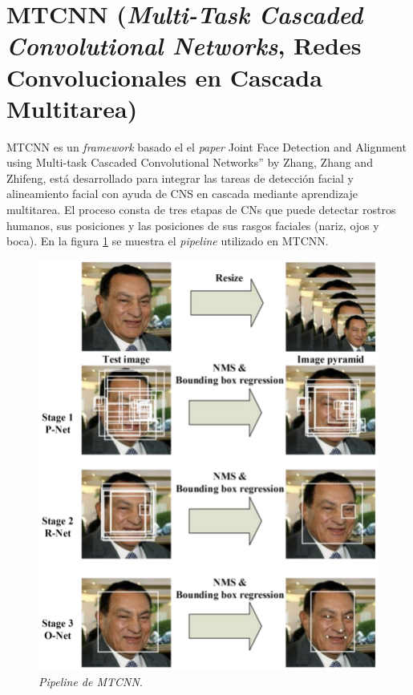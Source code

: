 \section{MTCNN (\textit{Multi-Task Cascaded Convolutional Networks}, Redes Convolucionales en Cascada Multitarea)}
MTCNN es un \textit{framework} basado el el \textit{paper} Joint Face Detection and Alignment using Multi-task Cascaded Convolutional Networks” by Zhang, Zhang and Zhifeng, está desarrollado para integrar las tareas de detección facial y alineamiento facial con ayuda de CNS en cascada mediante aprendizaje multitarea. El proceso consta de tres etapas de CNs que puede detectar rostros humanos, sus posiciones y las posiciones de sus rasgos faciales (nariz, ojos y boca). En la figura \ref{fig:mtcnn_pipe} se muestra el \textit{pipeline} utilizado en MTCNN.

\begin{figure}[h]
	\centering
	\includegraphics[scale=0.5]{./Figures/mtcnn_pipe.png}
	\caption{\textit{Pipeline de MTCNN}.}
	\label{fig:mtcnn_pipe}
\end{figure}

